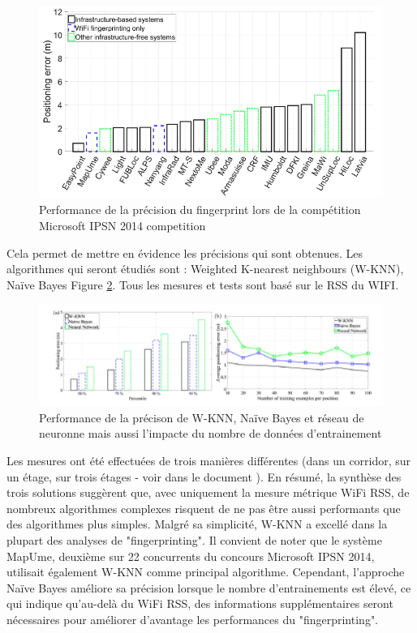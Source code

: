 \begin{figure}[htp]
	\begin{center}
		\includegraphics[scale=0.6]{figures/Competition.png}
		\caption{Performance de la précision du fingerprint lors de la compétition Microsoft IPSN 2014 competition \cite{CP_RSS}}
		\label{fig:Competition} %
	\end{center}
\end{figure}

Cela permet de mettre en évidence les précisions qui sont obtenues. Les algorithmes qui seront étudiés sont : Weighted K-nearest neighbours (W-KNN), Naïve Bayes Figure \ref{fig:PerfAccu}. Tous les mesures et tests sont basé sur le RSS du WIFI. 

\begin{figure}[htp]
	\begin{center}
		\includegraphics[scale=1]{figures/PerfAccu.png}
		\caption{Performance de la précison de W-KNN, Naïve Bayes et réseau de neuronne mais aussi l'impacte du nombre de données d'entrainement\cite{CP_RSS}}
		\label{fig:PerfAccu} %
	\end{center}
\end{figure}

Les mesures ont été effectuées de trois manières différentes (dans un corridor, sur un étage, sur trois étages - voir dans le document  \cite{CP_RSS}). En résumé, la synthèse des trois solutions suggèrent que, avec uniquement la mesure métrique WiFi RSS, de nombreux algorithmes complexes risquent de ne pas être aussi performants que des algorithmes plus simples. Malgré sa simplicité, W-KNN a excellé dans la plupart des analyses de "fingerprinting". Il convient de noter que le système MapUme, deuxième sur 22 concurrents du concours Microsoft IPSN 2014, utilisait également W-KNN comme principal algorithme. Cependant, l'approche Naïve Bayes améliore sa précision lorsque le nombre d'entrainements est élevé, ce qui indique qu'au-delà du WiFi RSS, des informations supplémentaires seront nécessaires pour améliorer d'avantage les performances du "fingerprinting".


